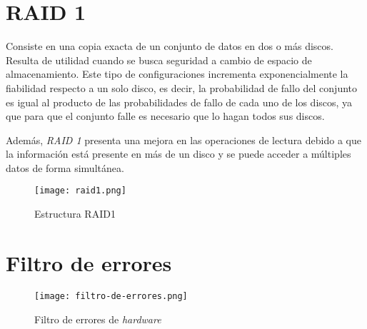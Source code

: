 \appendix
\section{RAID 1}\label{anx:raid1}
    Consiste en una copia exacta de un conjunto de datos en dos o más discos. Resulta de utilidad cuando se busca seguridad a cambio de espacio de almacenamiento. Este tipo de configuraciones incrementa exponencialmente la fiabilidad respecto a un solo disco, es decir, la probabilidad de fallo del conjunto es igual al producto de las probabilidades de fallo de cada uno de los discos, ya que para que el conjunto falle es necesario que lo hagan todos sus discos. \cite{raid1-es} \cite{raid1-en}
    
    Además, \textit{RAID 1} presenta una mejora en las operaciones de lectura debido a que la información está presente en más de un disco y se puede acceder a múltiples datos de forma simultánea.

    \begin{figure}[h!]
    \centering
        \texttt{[image: raid1.png]}
        \caption{Estructura RAID1}
        \label{fig:raid1}
    \end{figure}
    
\section{Filtro de errores}\label{anx:hw-info}
    \begin{figure}[H]
    \centering
        \texttt{[image: filtro-de-errores.png]}
        \caption{Filtro de errores de \textit{hardware}}
        \label{fig:error-filter}
    \end{figure}
    
